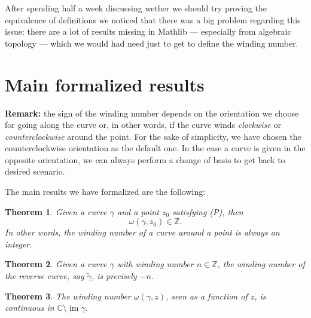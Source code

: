 \documentclass[a4paper,12pt]{article}
\newcommand{\imm}{\operatorname{im}}
\newtheorem{theorem}{Theorem}
\begin{document}
After spending half a week discussing wether we should try proving the equivalence of definitions we
noticed that there was a big problem regarding this issue: there are a lot of results missing in Mathlib
--- especially from algebraic topology --- which we would had need just to get to define the winding number.

\section{Main formalized results}

\noindent \textbf{Remark:} the sign of the winding number depends on the orientation we choose for going along
the curve or, in other words, if the curve winds \textit{clockwise} or \textit{counterclockwise} around the point.
For the sake of simplicity, we have chosen the counterclockwise orientation as the default one. In the case a curve is given
in the opposite orientation, we can always perform a change of basis to get back to desired scenario.

The main results we have formalized are the following:
\begin{theorem}
    Given a curve $\gamma$ and a point $z_0$ satisfying (P), then
    $$\omega(\gamma, z_0) \in \mathbb{Z}.$$
    In other words, the winding number of a curve around a point is always an integer.
\end{theorem}

\begin{theorem}
  Given a curve $\gamma$ with winding number $n \in \mathbb{Z}$, the winding number of the reverse curve,
  say $\tilde{\gamma}$, is precisely $-n$.
\end{theorem}

\begin{theorem}
  The winding number $\omega(\gamma, z)$, seen as a function of $z$, is continuous in $\mathbb{C}\setminus \imm \gamma$.
\end{theorem}
\end{document}
